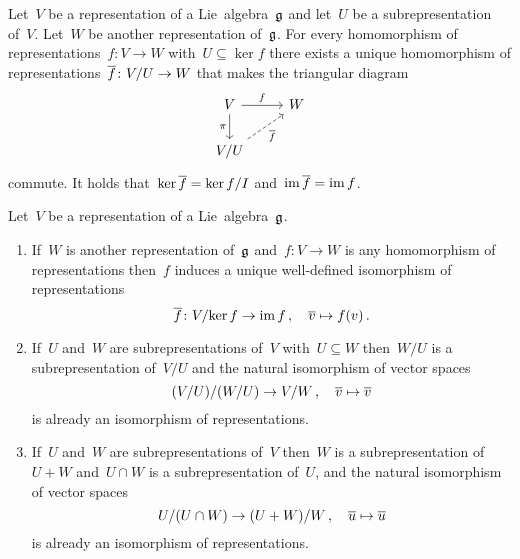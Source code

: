 \begin{proposition}
  \label{homomorphism theorem!for representations}
  Let~$V$ be a representation of a Lie~algebra~$\mathfrak{g}$ and let~$U$ be a subrepresentation of~$V$.
  Let~$W$ be another representation of~$\mathfrak{g}$.
  For every homomorphism of representations~$f \colon V \to W$ with~$U \subseteq \ker f$ there exists a unique homomorphism of representations~$\overline{f} \colon V/U \to W$ that makes the triangular diagram
  \[
    \begin{tikzcd}
      V
      \arrow{r}[above]{f}
      \arrow{d}[left]{\pi}
      &
      W
      \\
      V/U
      \arrow[dashed]{ur}[below right]{\induced{f}}
      &
      {}
    \end{tikzcd}
  \]
  commute.
  It holds that~$\ker \overline{f} = {\ker f}/I$ and~$\operatorname{im} \overline{f} = \operatorname{im} f$.
\end{proposition}


\begin{corollary}
  Let~$V$ be a representation of a Lie~algebra~$\mathfrak{g}$.
  \begin{enumerate}
    \item
      If~$W$ is another representation of~$\mathfrak{g}$ and~$f \colon V \to W$ is any homomorphism of representations then~$f$ induces a unique well-defined isomorphism of representations
      \[
        \overline{f}
        \colon
        V/{\ker f}
        \to
        \operatorname{im} f \,,
        \quad
        \overline{v}
        \mapsto
        f(v)  \,.
      \]
    \item
      If~$U$ and~$W$ are subrepresentations of~$V$ with~$U \subseteq W$ then~$W/U$ is a subrepresentation of~$V/U$ and the natural isomorphism of vector spaces
      \[
        (V/U) / (W/U)
        \to
        V/W \,,
        \quad
        \overline{v}
        \mapsto
        \overline{v}
      \]
      is already an isomorphism of representations.
    \item
      If~$U$ and~$W$ are subrepresentations of~$V$ then~$W$ is a subrepresentation of~$U+W$ and~$U \cap W$ is a subrepresentation of~$U$, and the natural isomorphism of vector spaces
      \[
        U/(U \cap W)
        \to
        (U + W)/W  \,,
        \quad
        \overline{u}
        \mapsto
        \overline{u}
      \]
      is already an isomorphism of representations.
  \end{enumerate}
\end{corollary}


